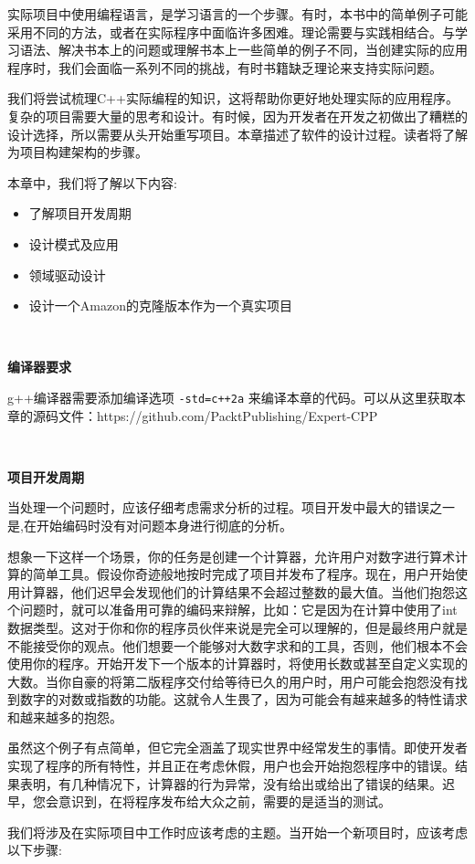 实际项目中使用编程语言，是学习语言的一个步骤。有时，本书中的简单例子可能采用不同的方法，或者在实际程序中面临许多困难。理论需要与实践相结合。与学习语法、解决书本上的问题或理解书本上一些简单的例子不同，当创建实际的应用程序时，我们会面临一系列不同的挑战，有时书籍缺乏理论来支持实际问题。 \par
我们将尝试梳理C++实际编程的知识，这将帮助你更好地处理实际的应用程序。复杂的项目需要大量的思考和设计。有时候，因为开发者在开发之初做出了糟糕的设计选择，所以需要从头开始重写项目。本章描述了软件的设计过程。读者将了解为项目构建架构的步骤。\par
本章中，我们将了解以下内容: \par

\begin{itemize}
	\item 了解项目开发周期
	\item 设计模式及应用
	\item 领域驱动设计
	\item 设计一个Amazon的克隆版本作为一个真实项目
\end{itemize}

\noindent\textbf{}\ \par
\textbf{编译器要求} \ \par
g++编译器需要添加编译选项 \texttt{-std=c++2a} 来编译本章的代码。可以从这里获取本章的源码文件：https:/​/github.​com/PacktPublishing/Expert-CPP \par

\noindent\textbf{}\ \par
\textbf{项目开发周期} \ \par
当处理一个问题时，应该仔细考虑需求分析的过程。项目开发中最大的错误之一是,在开始编码时没有对问题本身进行彻底的分析。 \par
想象一下这样一个场景，你的任务是创建一个计算器，允许用户对数字进行算术计算的简单工具。假设你奇迹般地按时完成了项目并发布了程序。现在，用户开始使用计算器，他们迟早会发现他们的计算结果不会超过整数的最大值。当他们抱怨这个问题时，就可以准备用可靠的编码来辩解，比如：它是因为在计算中使用了int数据类型。这对于你和你的程序员伙伴来说是完全可以理解的，但是最终用户就是不能接受你的观点。他们想要一个能够对大数字求和的工具，否则，他们根本不会使用你的程序。开始开发下一个版本的计算器时，将使用长数或甚至自定义实现的大数。当你自豪的将第二版程序交付给等待已久的用户时，用户可能会抱怨没有找到数字的对数或指数的功能。这就令人生畏了，因为可能会有越来越多的特性请求和越来越多的抱怨。 \par
虽然这个例子有点简单，但它完全涵盖了现实世界中经常发生的事情。即使开发者实现了程序的所有特性，并且正在考虑休假，用户也会开始抱怨程序中的错误。结果表明，有几种情况下，计算器的行为异常，没有给出或给出了错误的结果。迟早，您会意识到，在将程序发布给大众之前，需要的是适当的测试。 \par
我们将涉及在实际项目中工作时应该考虑的主题。当开始一个新项目时，应该考虑以下步骤: \par

